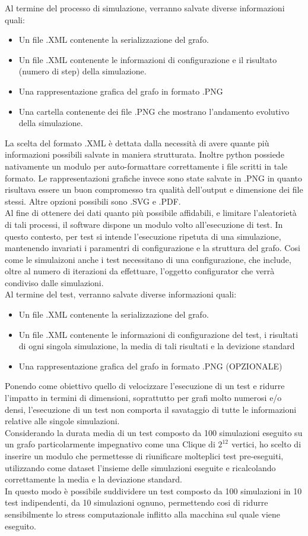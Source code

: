 \documentclass{article}
\begin{document}
Al termine del processo di simulazione, verranno salvate diverse informazioni quali:
\begin{itemize}
\item Un file .XML contenente la serializzazione del grafo.
\item Un file .XML contenente le informazioni di configurazione e il risultato (numero di step) della             simulazione.
\item Una rappresentazione grafica del grafo in formato .PNG
\item Una cartella contenente dei file .PNG che mostrano l'andamento evolutivo della simulazione.
\end{itemize}
La scelta del formato .XML è dettata dalla necessità di avere quante più informazioni possibili salvate in maniera strutturata. Inoltre python possiede nativamente un modulo per auto-formattare correttamente i file scritti in tale formato.
Le rappresentazioni grafiche invece sono state salvate in .PNG in quanto risultava essere un buon compromesso tra qualità dell'output e dimensione dei file stessi. Altre opzioni possibili sono .SVG e .PDF.\\

Al fine di ottenere dei dati quanto più possibile affidabili, e limitare l'aleatorietà di tali processi, il software dispone un modulo volto all'esecuzione di test. In questo contesto, per test si intende l'esecuzione ripetuta di una simulazione, mantenendo invariati i paramentri di configurazione e la struttura del grafo. Cosi come le simulaizoni anche i test necessitano di una configurazione, che include, oltre al numero di iterazioni da effettuare, l'oggetto configurator che verrà condiviso dalle simulazioni.\\
Al termine del test, verranno salvate diverse informazioni quali:
\begin{itemize}
\item Un file .XML contenente la serializzazione del grafo.
\item Un file .XML contenente le informazioni di configurazione del test, i risultati di ogni singola             simulazione, la media di tali risultati e la devizione standard
\item Una rappresentazione grafica del grafo in formato .PNG (OPZIONALE)
\end{itemize}
Ponendo come obiettivo quello di velocizzare l'esecuzione di un test e ridurre l'impatto in termini di dimensioni, soprattutto per grafi molto numerosi e/o densi, l'esecuzione di un test non comporta il savataggio di tutte le informazioni relative alle singole simulazioni.\\
Considerando la durata media di un test composto da 100 simulazioni eseguito su un grafo particolarmente  impegnativo come una Clique di $2^{12^{\mathrm{}}}$ vertici, ho scelto di inserire un modulo che permettesse di riunificare molteplici test pre-eseguiti, utilizzando come dataset l'insieme delle simulazioni eseguite e ricalcolando correttamente la media e la deviazione standard. \\
In questo modo è possibile suddividere un test composto da 100 simulazioni in 10 test indipendenti, da 10 simulazioni ognuno, permettendo cosi di ridurre sensibilmente lo stress computazionale inflitto alla macchina sul quale viene eseguito.
\end{document}
